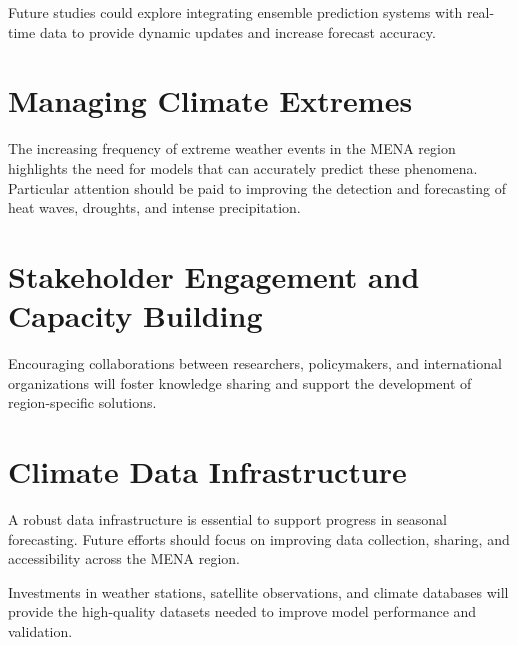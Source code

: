 Future studies could explore integrating ensemble prediction systems with real-time data to provide dynamic updates and increase forecast accuracy.

\section{Managing Climate Extremes}

The increasing frequency of extreme weather events in the MENA region highlights the need for models that can accurately predict these phenomena. Particular attention should be paid to improving the detection and forecasting of heat waves, droughts, and intense precipitation.

\section{Stakeholder Engagement and Capacity Building}

Encouraging collaborations between researchers, policymakers, and international organizations will foster knowledge sharing and support the development of region-specific solutions.

\section{Climate Data Infrastructure}

A robust data infrastructure is essential to support progress in seasonal forecasting. Future efforts should focus on improving data collection, sharing, and accessibility across the MENA region.

Investments in weather stations, satellite observations, and climate databases will provide the high-quality datasets needed to improve model performance and validation.
